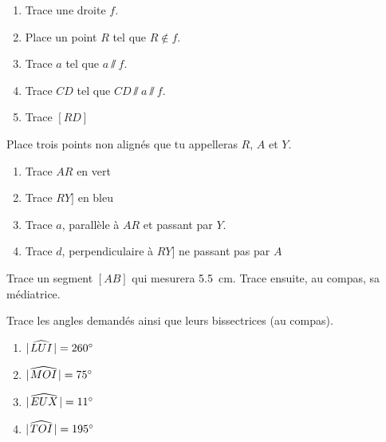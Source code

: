 \documentclass[../../syllabus_1.tex]{subfiles}
\begin{document}
\begin{exercise}

    \begin{enumerate}[label= $\ast $]
        \item Trace une droite $f$.
        \item Place un point $R$ tel que $R \notin f$.
        \item Trace $a$ tel que $a \varparallel f$.
        \item Trace $CD$ tel que $CD \varparallel a \varparallel f$.
        \item Trace $[RD]$
    \end{enumerate}
\end{exercise}

\begin{exercise}
    Place trois points non alignés que tu appelleras $R$, $A$ et $Y$.
    \begin{enumerate}[label= $\ast$]
        \item Trace $AR$ en vert
        \item Trace $RY]$ en bleu
        \item Trace $a$, parallèle à $AR$ et passant par $Y$.
        \item Trace $d$, perpendiculaire à $RY]$ ne passant pas par $A$
    \end{enumerate}
\end{exercise}

\begin{exercise}
    Trace un segment \([AB]\) qui mesurera \qty{5,5}{cm}. Trace ensuite, au compas, sa médiatrice.
\end{exercise}

\begin{exercise}
    Trace les angles demandés ainsi que leurs bissectrices (au compas).
    \begin{enumerate}[cols=2]
        \item \(\lvert\mkern2mu\widehat{LUI}\mkern2mu\rvert=\ang{260}\)
        \item \(\lvert\mkern2mu\widehat{MOI}\mkern2mu\rvert=\ang{75}\)
        \item \(\lvert\mkern2mu\widehat{EUX}\mkern2mu\rvert=\ang{11}\)
        \item \(\lvert\mkern2mu\widehat{TOI}\mkern2mu\rvert=\ang{195}\)
    \end{enumerate}
\end{exercise}

\newpage
\end{document}
